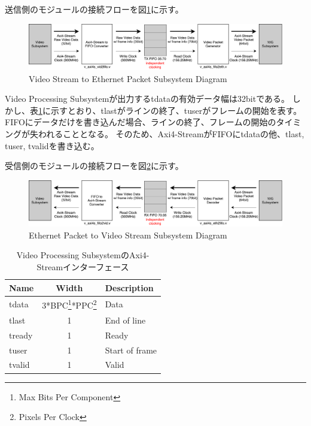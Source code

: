 送信側のモジュールの接続フローを図\ref{fig:fpga-video-ethernet-diagram}に示す。

\begin{figure}[htbp]
  \begin{center}
    \includegraphics[bb=0 0 911 166,width=15.5cm]{img/fpga-video-ethernet-diagram.pdf}
  \end{center}
  \caption{Video Stream to Ethernet Packet Subsystem Diagram}
  \label{fig:fpga-video-ethernet-diagram}
\end{figure}

Video Processing Subsystemが出力するtdataの有効データ幅は32bitである。
しかし、表\ref{tb:fpga-axi4-stream}に示すとおり、tlastがラインの終了、tuserがフレームの開始を表す。
FIFOにデータだけを書き込んだ場合、ラインの終了、フレームの開始のタイミングが失われることとなる。
そのため、Axi4-StreamがFIFOにtdataの他、tlast, tuser, tvalidを書き込む。


受信側のモジュールの接続フローを図\ref{fig:fpga-ethernet-video-diagram}に示す。

\begin{figure}[htbp]
  \begin{center}
    \includegraphics[bb=0 0 911 166,width=15.5cm]{img/fpga-ethernet-video-diagram.pdf}
  \end{center}
  \caption{Ethernet Packet to Video Stream Subsystem Diagram}
  \label{fig:fpga-ethernet-video-diagram}
\end{figure}

\begin{table}[htbp]
  \caption{Video Processing SubsystemのAxi4-Streamインターフェース}
  \label{tb:fpga-axi4-stream}
  \begin{center}
  \begin{tabular}{l|c|l}
    \hline
    Name   & Width     & Description \\\hline\hline
    tdata  & 3*BPC\footnote{Max Bits Per Component}*PPC\footnote{Pixels Per Clock} & Data \\\hline
    tlast  & 1         & End of line \\\hline
    tready & 1         & Ready \\\hline
    tuser  & 1         & Start of frame \\\hline
    tvalid & 1         & Valid \\\hline
  \end{tabular}\end{center}
\end{table}

